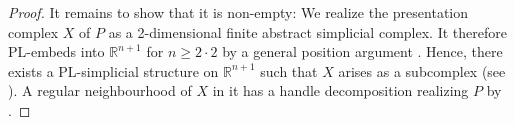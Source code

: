 \documentclass[a4paper, reqno]{amsart}
\theoremstyle{definition}
\theoremstyle{remark}
\newcommand{\Q}{\mathbb{Q}}
\newcommand{\N}{\mathbb{N}}
\newcommand{\R}{\mathbb{R}}
\renewcommand{\~}{\nobreak\ }
\begin{document}
\begin{proof}
    It remains to show that it is non-empty: We realize the presentation complex $X$ of $P$ as a 2-dimensional finite abstract simplicial complex. It therefore PL-embeds into $\R^{n+1}$ for $n\geq2\cdot2$ by a general position argument \cite[Theorem\~5.4]{rourkesandersonnew}. Hence, there exists a PL-simplicial structure on $\R^{n+1}$ such that $X$ arises as a subcomplex (see \cite[Theorem\~2.14]{rourkesandersonnew}). A regular neighbourhood of $X$ in it has a handle decomposition realizing $P$ by \cite[Proposition\~6.9]{rourkesandersonnew}.

\end{proof}
\end{document}

